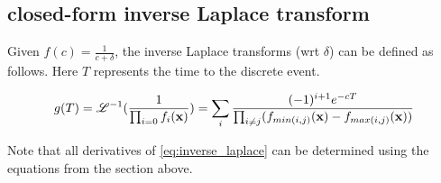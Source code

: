 \documentclass[10pt, a4]{article}
\begin{document}
\subsection*{closed-form inverse Laplace transform}
Given $f(c) = \frac{1}{c+\delta}$, the inverse Laplace transforms (wrt $\delta$) can be defined as follows. Here $T$ represents the time to the discrete event.

\begin{equation} \label{eq:inverse_laplace}
g(T) = \mathscr{L}^{-1}(\frac{1}{\prod_{i=0} f_i(\bold{x})}) = \sum_i \frac{(-1)^{i+1} e^{-cT}}{\prod_{i\neq j} (f_{min(i,j)}(\bold{x})-f_{max(i,j)}(\bold{x}))}
\end{equation}

Note that all derivatives of \ref{eq:inverse_laplace} can be determined using the equations from the section above.
\end{document}
